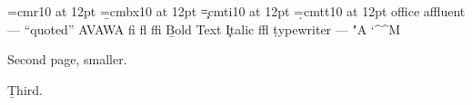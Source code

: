  
\font\a=cmr10 at 12pt \font\b=cmbx10 at 12pt \font\c=cmti10 at 12pt \font\d=cmtt10 at 12pt
\pdfhorigin=0.5in \pdfvorigin=0.75in
\a office affluent --- ``quoted'' AVAWA fi fl ffi \b Bold Text \c Italic \/ ffl \d typewriter ---
   \a{} \char"A \char`\^^M
\par\vfill\eject
\pdfpagewidth=5in \pdfpageheight=4in \a Second page, smaller.\par\eject
\pdfpagewidth=8in \pdfpageheight=3in \hoffset=1in \voffset=-0.5in \b Third.\bye
